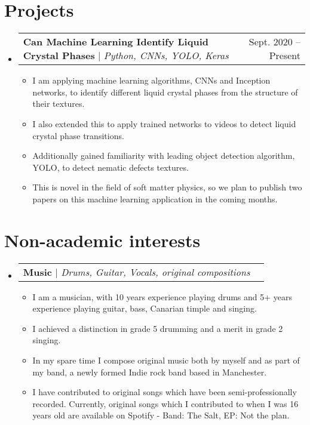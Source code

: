 \documentclass[letterpaper,11pt]{article}
\makeatletter
\newcommand{\resumeItem}[1]{
  \item\small{
    {#1 \vspace{-2pt}}
  }
}
\newcommand{\resumeProjectHeading}[2]{
    \item
    \begin{tabular*}{0.97\textwidth}{l@{\extracolsep{\fill}}r}
      \small#1 & #2 \\
    \end{tabular*}\vspace{-7pt}
}
\newcommand{\resumeSubHeadingListStart}{\begin{itemize}[leftmargin=0.15in, label={}]}
\newcommand{\resumeSubHeadingListEnd}{\end{itemize}}
\newcommand{\resumeItemListStart}{\begin{itemize}}
\newcommand{\resumeItemListEnd}{\end{itemize}\vspace{-5pt}}
\makeatother
\begin{document}
\section{Projects}
    \resumeSubHeadingListStart
      \resumeProjectHeading
          {\textbf{Can Machine Learning Identify Liquid Crystal Phases} $|$ \emph{Python, CNNs, YOLO, Keras}}{Sept. 2020 -- Present}
          \resumeItemListStart
            \resumeItem{I am applying machine learning algorithms, CNNs and Inception networks, to identify different liquid crystal phases from the structure of their textures.}
            \resumeItem{I also extended this to apply trained networks to videos to detect liquid crystal phase transitions.}
            \resumeItem{Additionally gained familiarity with leading object detection algorithm, YOLO, to detect nematic defects textures.}
            \resumeItem{This is novel in the field of soft matter physics, so we plan to publish two papers on this machine learning application in the coming months.}
          \resumeItemListEnd
    \resumeSubHeadingListEnd

\section{Non-academic interests}
\resumeSubHeadingListStart
    \resumeProjectHeading
          {\textbf{Music} $|$ \emph{Drums, Guitar, Vocals, original compositions}}{}
          \resumeItemListStart
            \resumeItem{I am a musician, with 10 years experience playing drums and 5+ years experience playing guitar, bass, Canarian timple and singing.}
            \resumeItem{I achieved a distinction in grade 5 drumming and a merit in grade 2 singing.}
            \resumeItem{In my spare time I compose original music both by myself and as part of my band, a newly formed Indie rock band based in Manchester.}
            \resumeItem{I have contributed to original songs which have been semi-professionally recorded. Currently, original songs which I contributed to when I was 16 years old are available on Spotify - Band: The Salt, EP: Not the plan.}
          \resumeItemListEnd
    \resumeSubHeadingListEnd

%
\end{document}
